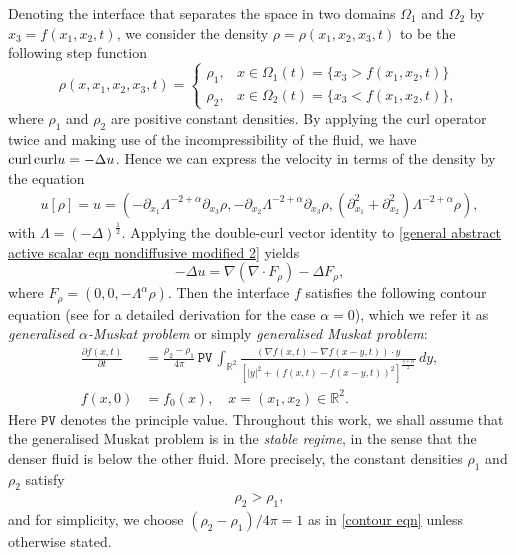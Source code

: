 \documentclass[reqno]{amsart}%
\theoremstyle{definition}
\theoremstyle{remark}
\numberwithin{equation}{section}
\newcommand{\0}{\mathbf{0}}
\newcommand{\1}{\mathbf{1}}
\newcommand{\PV}{\texttt{PV}}
\numberwithin{equation}{section}
\numberwithin{theorem}{section}
\numberwithin{figure}{section}
\begin{document}
Denoting the interface
that separates the space in two domains $\Omega_1$ and $\Omega_2$ by $x_3 = f (x_1, x_2, t)$, we consider the density $\rho = \rho(x_1, x_2, x_3, t)$ to be the following step function
\begin{equation}\label{step function for rho}
\rho(x, x_1, x_2, x_3, t) =
\begin{cases}
\rho_1 , & x \in \Omega_1(t) = \{ x_3 > f(x_1, x_2, t) \} \\
\rho_2 , & x \in \Omega_2(t) = \{ x_3 < f(x_1, x_2, t) \},
\end{cases}
\end{equation}
where $\rho_1$ and $\rho_2$ are positive constant densities. By applying the curl operator twice and making use of the incompressibility of the fluid, we have ${\rm curl }\,{\rm curl } u = -\Delta u$. {Hence we can express the velocity in terms of the density by the equation
\begin{align}\label{eqn between velocity and density}
u[\rho]=u = (-\partial_{x_1}\Lambda^{-2+\alpha}\partial_{x_3}\rho, -
\partial_{x_2}\Lambda^{-2+\alpha}\partial_{x_3}\rho,
(\partial_{x_1}^2+\partial_{x_2}^2)\Lambda^{-2+\alpha}\rho),
\end{align}
with $\Lambda=(-\Delta)^\frac{1}{2}$. Applying the double-curl
vector identity to \eqref{general abstract active scalar eqn nondiffusive modified 2} yields 
$$-\Delta u = \nabla(\nabla \cdot F_\rho) - \Delta
F_\rho,$$ 
where $F_\rho = (0,0,-\Lambda^\alpha \rho)$.} Then the interface $f$ satisfies the following contour equation (see \cite{CG07} for a detailed derivation for the case $\alpha=0$), which we refer it as {\it generalised $\alpha$-Muskat problem} or simply {\it generalised Muskat problem}:
\begin{equation}\label{contour eqn}
\begin{split}
\frac{\partial f(x,t)}{\partial t} &= \frac{\rho_2 - \rho_1}{4\pi} \, \PV \, \int_{\mathbb{R}^2} \frac{ \left( \nabla f(x,t) - \nabla f(x - y, t) \right) \cdot y }{ \left[ |y|^2 + (f(x,t) - f(x - y, t))^2 \right]^{\frac{3 + \alpha}{2}}} \, dy, \\
f(x,0) &= f_0(x), \quad x=(x_1, x_2) \in \mathbb{R}^2.
\end{split}
\end{equation}
Here $\PV$ denotes the principle value. Throughout this work, we shall assume that the generalised Muskat problem is in the {\it stable regime}, in the sense that the denser fluid is below the other fluid. More precisely, the constant densities $\rho_1$ and $\rho_2$ satisfy
\begin{align}\label{stable case assumption}
\rho_2>\rho_1,
\end{align}
and for simplicity, we choose $(\rho_2 - \rho_1)/4\pi=1$ as in \eqref{contour eqn} unless otherwise stated. 
\end{document}
